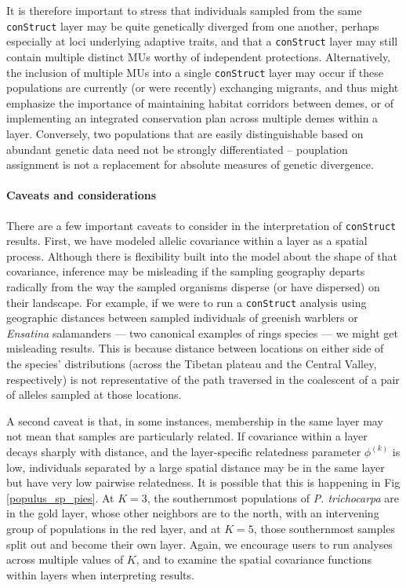 \documentclass[10pt,letterpaper]{article}
\begin{document}
It is therefore important to stress that individuals sampled from the same \texttt{conStruct} layer 
may be quite genetically diverged from one another, 
perhaps especially at loci underlying adaptive traits, 
and that a \texttt{conStruct} layer may still contain multiple distinct MUs worthy of independent protections.  
Alternatively, the inclusion of multiple MUs into a single \texttt{conStruct} layer 
may occur if these populations are currently 
(or were recently) exchanging migrants, 
and thus might emphasize the importance of maintaining habitat corridors between demes, 
or of implementing an integrated conservation plan across multiple demes within a layer.
Conversely, two populations that are easily distinguishable based on abundant genetic data
need not be strongly differentiated --
pouplation assignment is not a replacement for absolute measures of genetic divergence.

\paragraph{Caveats and considerations}
There are a few important caveats to consider in the interpretation of \texttt{conStruct} results. 
First, we have modeled allelic covariance within a layer as a spatial process.
Although there is flexibility built into the model about the shape of that covariance, 
inference may be misleading if the sampling geography departs radically from the way 
the sampled organisms disperse (or have dispersed) on their landscape.
For example, if we were to run a \texttt{conStruct} analysis using geographic distances between 
sampled individuals of greenish warblers \cite{Irwin2001} or \textit{Ensatina} salamanders \cite{wake_schneider1998} 
--- two canonical examples of rings species --- 
we might get misleading results.
This is because distance between locations on either side of the species' distributions
(across the Tibetan plateau and the Central Valley, respectively) 
is not representative of the path traversed in the coalescent of a pair of alleles sampled at those locations.

A second caveat is that, in some instances, 
membership in the same layer may not mean that samples are particularly related.
If covariance within a layer decays sharply with distance, 
and the layer-specific relatedness parameter $\phi^{(k)}$ is low, 
individuals separated by a large spatial distance may be in the same layer but have very low pairwise relatedness.
It is possible that this is happening in Fig \ref{populus_sp_pies}. 
At $K=3$, the southernmost populations of \textit{P. trichocarpa} are in the gold layer, 
whose other neighbors are to the north, with an intervening group of populations in the red layer, 
and at $K=5$, those southernmost samples split out and become their own layer.
Again, we encourage users to run analyses across multiple values of $K$, 
and to examine the spatial covariance functions within layers when interpreting results.
\end{document}
